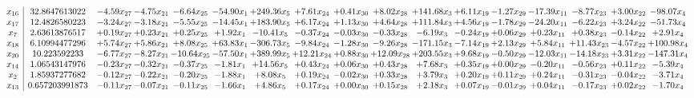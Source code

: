 \documentclass[9pt]{article}
\begin{document}
 \[\begin{array}{c| c c@{\hskip 2pt} c@{\hskip 2pt} c@{\hskip 2pt} c@{\hskip 2pt} c@{\hskip 2pt} c@{\hskip 2pt} c@{\hskip 2pt} c@{\hskip 2pt} c@{\hskip 2pt} c@{\hskip 2pt} c@{\hskip 2pt} c@{\hskip 2pt} c@{\hskip 2pt} c@{\hskip 2pt} c@{\hskip 2pt} }
 x_{16}   &  32.8647613022 & -4.59 x_{27} & -4.75 x_{21} & -6.64 x_{25} & -54.90 x_{1} & + 249.36 x_{5} & +  7.61 x_{24} & +  0.41 x_{30} & +  8.02 x_{28} & + 141.68 x_{3} & +  6.11 x_{19} & -1.27 x_{29} & -17.39 x_{11} & -8.77 x_{23} & +  3.00 x_{22} & -98.07 x_{4}\\
 x_{17}   &  12.4826580223 & -3.24 x_{27} & -3.18 x_{21} & -5.55 x_{25} & -14.45 x_{1} & + 183.90 x_{5} & +  6.17 x_{24} & +  1.13 x_{30} & +  4.64 x_{28} & + 111.84 x_{3} & +  4.56 x_{19} & -1.78 x_{29} & -24.20 x_{11} & -6.22 x_{23} & +  3.24 x_{22} & -51.73 x_{4}\\
 x_{7}   &  2.63613876517 & +  0.19 x_{27} & +  0.23 x_{21} & +  0.25 x_{25} & +  1.92 x_{1} & -10.41 x_{5} & -0.37 x_{24} & -0.03 x_{30} & -0.33 x_{28} & -6.19 x_{3} & -0.24 x_{19} & +  0.06 x_{29} & +  0.23 x_{11} & +  0.38 x_{23} & -0.14 x_{22} & +  2.91 x_{4}\\
 x_{18}   &  6.10994477296 & +  5.74 x_{27} & +  5.86 x_{21} & +  8.08 x_{25} & + 63.83 x_{1} & -306.73 x_{5} & -9.84 x_{24} & -1.28 x_{30} & -9.26 x_{28} & -171.15 x_{3} & -7.14 x_{19} & +  2.13 x_{29} & +  5.84 x_{11} & + 11.43 x_{23} & -4.57 x_{22} & + 100.98 x_{4}\\
 x_{20}   &  10.223592233 & -6.77 x_{27} & -8.27 x_{21} & -10.64 x_{25} & -57.50 x_{1} & + 389.99 x_{5} & + 12.21 x_{24} & +  0.88 x_{30} & + 12.09 x_{28} & + 203.55 x_{3} & +  9.68 x_{19} & -0.50 x_{29} & -12.03 x_{11} & -14.18 x_{23} & +  3.31 x_{22} & -147.31 x_{4}\\
 x_{14}   &  1.06543147976 & -0.23 x_{27} & -0.32 x_{21} & -0.37 x_{25} & -1.81 x_{1} & + 14.56 x_{5} & +  0.43 x_{24} & +  0.06 x_{30} & +  0.43 x_{28} & +  7.68 x_{3} & +  0.35 x_{19} & +  0.00 x_{29} & -0.20 x_{11} & -0.56 x_{23} & +  0.11 x_{22} & -5.39 x_{4}\\
 x_{2}   &  1.85937277682 & -0.12 x_{27} & -0.22 x_{21} & -0.20 x_{25} & -1.88 x_{1} & +  8.08 x_{5} & +  0.19 x_{24} & -0.02 x_{30} & +  0.33 x_{28} & +  3.79 x_{3} & +  0.20 x_{19} & +  0.11 x_{29} & +  0.24 x_{11} & -0.31 x_{23} & -0.04 x_{22} & -3.71 x_{4}\\
 x_{13}   &  0.657203991873 & -0.11 x_{27} & -0.07 x_{21} & -0.11 x_{25} & -1.66 x_{1} & +  4.86 x_{5} & +  0.17 x_{24} & +  0.00 x_{30} & +  0.15 x_{28} & +  2.18 x_{3} & +  0.07 x_{19} & -0.01 x_{29} & +  0.04 x_{11} & -0.17 x_{23} & +  0.02 x_{22} & -1.70 x_{4}\\

\end{array}\]
\end{document}
